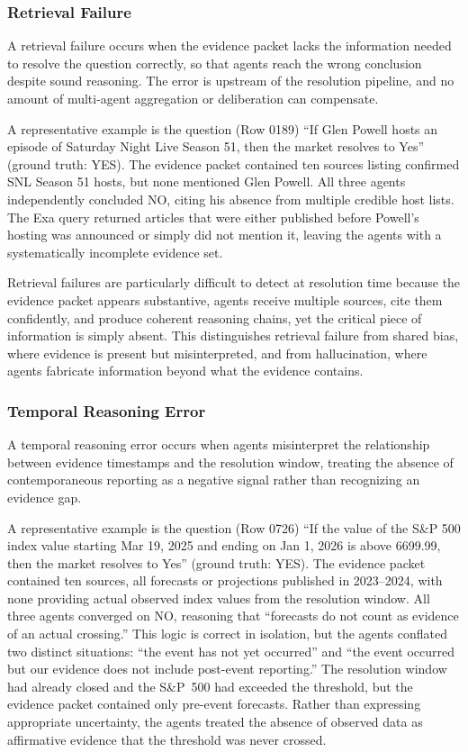 \subsubsection{Retrieval Failure}

A retrieval failure occurs when the evidence packet lacks the information needed to resolve the question correctly, so that agents reach the wrong conclusion despite sound reasoning. The error is upstream of the resolution pipeline, and no amount of multi-agent aggregation or deliberation can compensate.

A representative example is the question (Row 0189) ``If Glen Powell hosts an episode of Saturday Night Live Season 51, then the market resolves to Yes'' (ground truth: YES). The evidence packet contained ten sources listing confirmed SNL Season 51 hosts, but none mentioned Glen Powell. All three agents independently concluded NO, citing his absence from multiple credible host lists. The Exa query returned articles that were either published before Powell's hosting was announced or simply did not mention it, leaving the agents with a systematically incomplete evidence set.

Retrieval failures are particularly difficult to detect at resolution time because the evidence packet appears substantive, agents receive multiple sources, cite them confidently, and produce coherent reasoning chains, yet the critical piece of information is simply absent. This distinguishes retrieval failure from shared bias, where evidence is present but misinterpreted, and from hallucination, where agents fabricate information beyond what the evidence contains.


\subsubsection{Temporal Reasoning Error}

A temporal reasoning error occurs when agents misinterpret the relationship between evidence timestamps and the resolution window, treating the absence of contemporaneous reporting as a negative signal rather than recognizing an evidence gap.

A representative example is the question (Row 0726) ``If the value of the S\&P 500 index value starting Mar 19, 2025 and ending on Jan 1, 2026 is above 6699.99, then the market resolves to Yes'' (ground truth: YES). The evidence packet contained ten sources, all forecasts or projections published in 2023--2024, with none providing actual observed index values from the resolution window. All three agents converged on NO, reasoning that ``forecasts do not count as evidence of an actual crossing.'' This logic is correct in isolation, but the agents conflated two distinct situations: ``the event has not yet occurred'' and ``the event occurred but our evidence does not include post-event reporting.'' The resolution window had already closed and the S\&P~500 had exceeded the threshold, but the evidence packet contained only pre-event forecasts. Rather than expressing appropriate uncertainty, the agents treated the absence of observed data as affirmative evidence that the threshold was never crossed.

